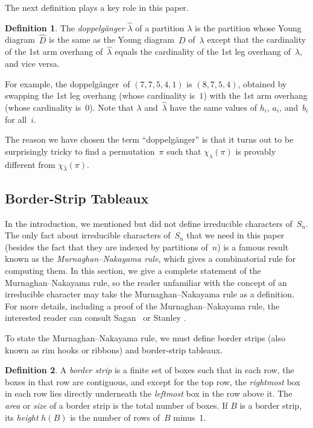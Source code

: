 \documentclass[12pt]{article}
\newcommand{\dop}{doppelg\"anger}
\theoremstyle{definition}
\newtheorem{definition}{Definition}
\begin{document}
The next definition plays a key role in this paper.

\begin{definition}
The \emph{\dop} $\hat\lambda$ of a partition $\lambda$ is
the partition whose Young diagram~$\hat D$
is the same as the Young diagram~$D$ of~$\lambda$
except that the cardinality of the 1st arm overhang of~$\hat\lambda$
equals the cardinality of the 1st leg overhang of~$\lambda$,
and vice versa.
\end{definition}

 For example, the \dop\ of $(7,7,5,4,1)$
is $(8,7,5,4)$, obtained by swapping the 1st leg overhang
(whose cardinality is~$1$) with the 1st arm overhang
(whose cardinality is~$0$).
Note that $\lambda$ and~$\hat\lambda$ have
the same values of $h_i$, $a_i$, and~$b_i$ for all~$i$.


The reason we have chosen the term ``\dop'' is that it turns out
to be surprisingly tricky to find a permutation~$\pi$ such that
$\chi_\lambda(\pi)$ is provably different from $\chi_{\hat\lambda}(\pi)$.

\subsection{Border-Strip Tableaux}
\label{sec:bst}

 In the introduction, we mentioned but did not define
irreducible characters of~$S_n$.
The only fact about irreducible characters of~$S_n$
that we need in this paper
(besides the fact that they are indexed by partitions of~$n$)
is a famous result known as the
\emph{Murnaghan--Nakayama rule}, which gives a combinatorial
rule for computing them.
In this section, we give a complete statement of the
Murnaghan--Nakayama rule,
so the reader unfamiliar with the concept of an irreducible
character may take the Murnaghan--Nakayama rule as a definition.
For more details, including a proof of the
Murnaghan--Nakayama rule, the interested reader can consult
Sagan~\cite[Section 4.10]{sagan} or Stanley \cite[Chapter 7]{stanley2}.


To state the Murnaghan--Nakayama rule, we must define
border strips (also known as rim hooks or ribbons)
and border-strip tableaux.

\begin{definition}

A \emph{border strip} is a finite set of boxes such that
in each row, the boxes in that row are contiguous,
and except for the top row, the \emph{rightmost} box in each row
lies directly underneath the \emph{leftmost} box in the row above it.
The \emph{area} or \emph{size} of a border strip is the total number of boxes.
If $B$ is a border strip, its \emph{height} $h(B)$
is the number of rows of~$B$ minus~1.
\end{definition}
\end{document}
